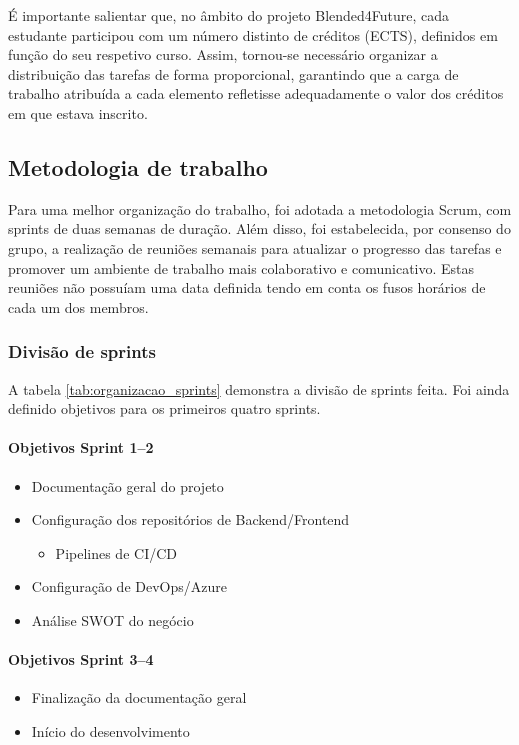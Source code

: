É importante salientar que, no âmbito do projeto Blended4Future, cada estudante participou com um número distinto de créditos (ECTS), definidos em função do seu respetivo curso. Assim, tornou-se necessário organizar a distribuição das tarefas de forma proporcional, garantindo que a carga de trabalho atribuída a cada elemento refletisse adequadamente o valor dos créditos em que estava inscrito.

\subsection{Metodologia de trabalho}

Para uma melhor organização do trabalho, foi adotada a metodologia Scrum, com sprints de duas semanas de duração. Além disso, foi estabelecida, por consenso do grupo, a realização de reuniões semanais para atualizar o progresso das tarefas e promover um ambiente de trabalho mais colaborativo e comunicativo. Estas reuniões não possuíam uma data definida tendo em conta os fusos horários de cada um dos membros.

\subsubsection{Divisão de sprints}

A tabela \ref{tab:organizacao_sprints} demonstra a divisão de sprints feita. Foi ainda definido objetivos para os primeiros quatro sprints.

\paragraph*{Objetivos Sprint 1–2}
\begin{itemize}[nosep,leftmargin=*]
  \item Documentação geral do projeto
  \item Configuração dos repositórios de Backend/Frontend
    \begin{itemize}[nosep,leftmargin=*]
      \item Pipelines de CI/CD
    \end{itemize}
  \item Configuração de DevOps/Azure
  \item Análise SWOT do negócio
\end{itemize}

\paragraph*{Objetivos Sprint 3–4}
\begin{itemize}[nosep,leftmargin=*]
  \item Finalização da documentação geral
  \item Início do desenvolvimento
\end{itemize}


